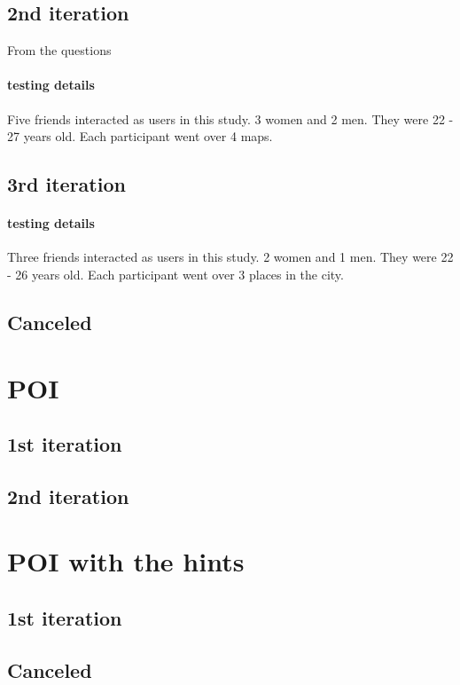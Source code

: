 			\subsection{2nd iteration}
				From the questions
				
				
				
				\paragraph{testing details}
					Five friends interacted as users in this study. 3 women and 2 men. They were 22 - 27 years old. Each participant went over 4 maps.
			\subsection{3rd iteration}
				\paragraph{testing details}
					Three friends interacted as users in this study. 2 women and 1 men. They were 22 - 26 years old. Each participant went over 3 places in the city.		
			\subsection{Canceled}
		\section{POI}		
			\subsection{1st iteration}
			\subsection{2nd iteration}		
		\section{POI with the hints}
			\subsection{1st iteration}
			\subsection{Canceled}	
